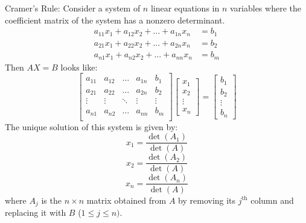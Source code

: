 \documentclass[12pt]{article}
\begin{document}
\begin{theorem} Cramer's Rule: Consider a system of $n$ linear equations in $n$ variables where the coefficient matrix of the system has a nonzero determinant. 
$$ \begin{array}{rcl} a_{11}x_1 + a_{12}x_2 + ... + a_{1n}x_n & =  b_1 \\
 a_{21}x_1 + a_{22}x_2 + ... + a_{2n}x_n & =  b_2 \\
 a_{n1}x_1 + a_{n2}x_2 + ... + a_{nn}x_n & =  b_m \end{array} $$ 
 Then $AX = B$ looks like: $$ \begin{bmatrix} 
a_{11} & a_{12} & \ldots & a_{1n} & b_1 \\
a_{21} & a_{22} & \ldots & a_{2n} & b_2 \\ 
\vdots & \vdots & \ddots & \vdots & \vdots \\
a_{n1} & a_{n2} & \ldots & a_{nn} & b_m \\
\end{bmatrix} \begin{bmatrix} x_1 \\ x_2 \\ \vdots \\ x_n \end{bmatrix} = \begin{bmatrix} b_1 \\ b_2 \\ \vdots \\ b_n \end{bmatrix} $$ 
The unique solution of this system is given by: $$ x_1 = \frac{\det(A_1)}{\det(A)} $$ $$x_2 = \frac{\det(A_2)}{\det(A)} $$ $$x_n = \frac{\det(A_n)}{\det(A)} $$ where $A_{j}$ is the $n \times n$ matrix obtained from $A$ by removing its $j^\text{th}$ column and replacing it with $B$ ($1 \leq j \leq n)$. \end{theorem} 
\end{document}
